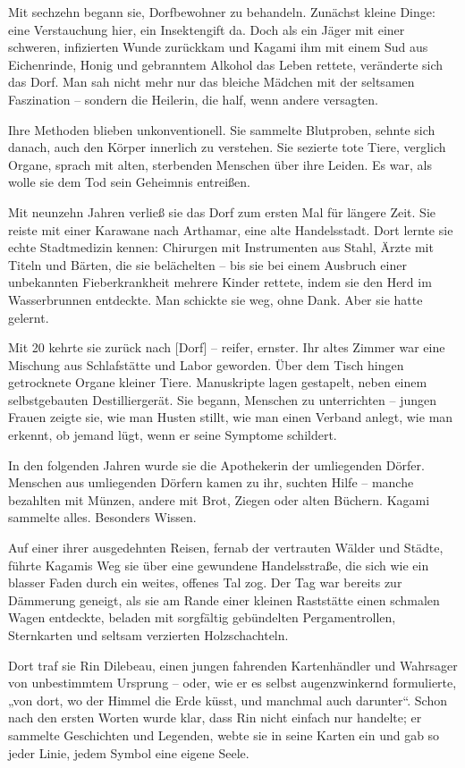 \documentclass[12pt,a4paper]{article}
\begin{document}
Mit sechzehn begann sie, Dorfbewohner zu behandeln. Zunächst kleine Dinge: eine Verstauchung hier, ein Insektengift da. Doch als ein Jäger mit einer schweren, infizierten Wunde zurückkam und Kagami ihm mit einem Sud aus Eichenrinde, Honig und gebranntem Alkohol das Leben rettete, veränderte sich das Dorf. Man sah nicht mehr nur das bleiche Mädchen mit der seltsamen Faszination – sondern die Heilerin, die half, wenn andere versagten.

Ihre Methoden blieben unkonventionell. Sie sammelte Blutproben, sehnte sich danach, auch den Körper innerlich zu verstehen. Sie sezierte tote Tiere, verglich Organe, sprach mit alten, sterbenden Menschen über ihre Leiden. Es war, als wolle sie dem Tod sein Geheimnis entreißen.

Mit neunzehn Jahren verließ sie das Dorf zum ersten Mal für längere Zeit. Sie reiste mit einer Karawane nach Arthamar, eine alte Handelsstadt. Dort lernte sie echte Stadtmedizin kennen: Chirurgen mit Instrumenten aus Stahl, Ärzte mit Titeln und Bärten, die sie belächelten – bis sie bei einem Ausbruch einer unbekannten Fieberkrankheit mehrere Kinder rettete, indem sie den Herd im Wasserbrunnen entdeckte. Man schickte sie weg, ohne Dank. Aber sie hatte gelernt.

Mit 20 kehrte sie zurück nach [Dorf] – reifer, ernster. Ihr altes Zimmer war eine Mischung aus Schlafstätte und Labor geworden. Über dem Tisch hingen getrocknete Organe kleiner Tiere. Manuskripte lagen gestapelt, neben einem selbstgebauten Destilliergerät. Sie begann, Menschen zu unterrichten – jungen Frauen zeigte sie, wie man Husten stillt, wie man einen Verband anlegt, wie man erkennt, ob jemand lügt, wenn er seine Symptome schildert.

In den folgenden Jahren wurde sie die Apothekerin der umliegenden Dörfer. Menschen aus umliegenden Dörfern kamen zu ihr, suchten Hilfe – manche bezahlten mit Münzen, andere mit Brot, Ziegen oder alten Büchern. Kagami sammelte alles. Besonders Wissen.

Auf einer ihrer ausgedehnten Reisen, fernab der vertrauten Wälder und Städte, führte Kagamis Weg sie über eine gewundene Handelsstraße, die sich wie ein blasser Faden durch ein weites, offenes Tal zog. Der Tag war bereits zur Dämmerung geneigt, als sie am Rande einer kleinen Raststätte einen schmalen Wagen entdeckte, beladen mit sorgfältig gebündelten Pergamentrollen, Sternkarten und seltsam verzierten Holzschachteln.

Dort traf sie Rin Dilebeau, einen jungen fahrenden Kartenhändler und Wahrsager von unbestimmtem Ursprung – oder, wie er es selbst augenzwinkernd formulierte, „von dort, wo der Himmel die Erde küsst, und manchmal auch darunter“. Schon nach den ersten Worten wurde klar, dass Rin nicht einfach nur handelte; er sammelte Geschichten und Legenden, webte sie in seine Karten ein und gab so jeder Linie, jedem Symbol eine eigene Seele.
\end{document}
